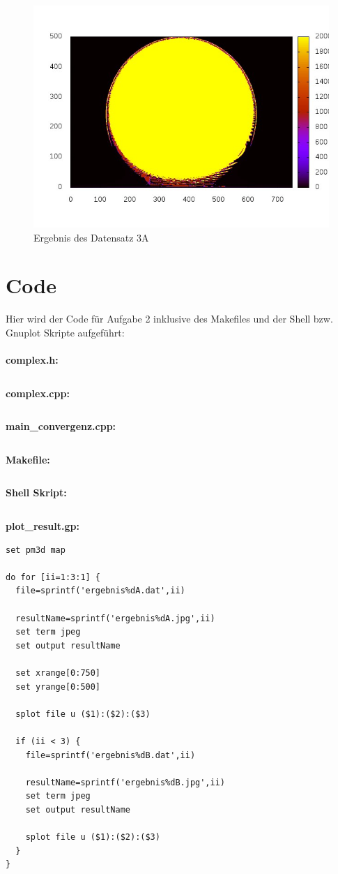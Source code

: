 \documentclass{report}
\begin{document}
\begin{figure}[h]
    \includegraphics[scale=0.7]{ergebnis3A}
    \caption{Ergebnis des Datensatz 3A}
    \label{fig:ergebnis3A} %
\end{figure}


\section{Code}\label{sec:codeA2}

Hier wird der Code für Aufgabe 2 inklusive des Makefiles und der Shell bzw. Gnuplot Skripte aufgeführt: \\
\\

\textbf{complex.h: }
\inputminted[autogobble]{C++}{complex_a2.h}

\clearpage{}
\textbf{complex.cpp: }
\inputminted[autogobble]{C++}{complex_a2.cpp}

\clearpage{}
\textbf{main\_convergenz.cpp: }
\inputminted[autogobble]{C++}{main_convergenz_a2.cpp}

\clearpage{}
\textbf{Makefile: }
\inputminted[autogobble]{make}{Makefile_a2}

\clearpage{}
\textbf{Shell Skript: }
\inputminted[autogobble]{bash}{run_all_a2.sh}


\clearpage
\textbf{plot\_result.gp: }
\begin{lstlisting}
set pm3d map

do for [ii=1:3:1] {
  file=sprintf('ergebnis%dA.dat',ii)

  resultName=sprintf('ergebnis%dA.jpg',ii)
  set term jpeg
  set output resultName

  set xrange[0:750]
  set yrange[0:500]

  splot file u ($1):($2):($3)

  if (ii < 3) {
    file=sprintf('ergebnis%dB.dat',ii)

    resultName=sprintf('ergebnis%dB.jpg',ii)
    set term jpeg
    set output resultName

    splot file u ($1):($2):($3)
  }
}
\end{lstlisting}
\end{document}
